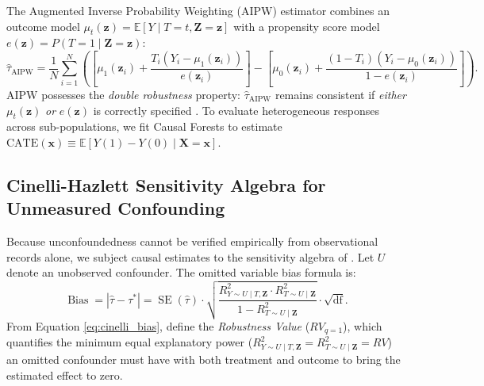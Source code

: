 The Augmented Inverse Probability Weighting (AIPW) estimator combines an outcome model $\mu_t(\mathbf{z}) = \mathbb{E}[Y \mid T=t, \mathbf{Z}=\mathbf{z}]$ with a propensity score model $e(\mathbf{z}) = P(T=1 \mid \mathbf{Z}=\mathbf{z})$:
\begin{equation}
    \hat{\tau}_{\text{AIPW}} = \frac{1}{N} \sum_{i=1}^N \left( \left[ \mu_1(\mathbf{z}_i) + \frac{T_i (Y_i - \mu_1(\mathbf{z}_i))}{e(\mathbf{z}_i)} \right] - \left[ \mu_0(\mathbf{z}_i) + \frac{(1 - T_i)(Y_i - \mu_0(\mathbf{z}_i))}{1 - e(\mathbf{z}_i)} \right] \right).
    \label{eq:aipw_estimator}
\end{equation}
AIPW possesses the \textit{double robustness} property: $\hat{\tau}_{\text{AIPW}}$ remains consistent if \emph{either} $\mu_t(\mathbf{z})$ \emph{or} $e(\mathbf{z})$ is correctly specified \parencite{hernan2020causal}. To evaluate heterogeneous responses across sub-populations, we fit Causal Forests \parencite{wager2018causalforest} to estimate $\text{CATE}(\mathbf{x}) \equiv \mathbb{E}[Y(1) - Y(0) \mid \mathbf{X} = \mathbf{x}]$.

\subsection{Cinelli-Hazlett Sensitivity Algebra for Unmeasured Confounding}

Because unconfoundedness cannot be verified empirically from observational records alone, we subject causal estimates to the sensitivity algebra of \textcite{cinelli2020making}. Let $U$ denote an unobserved confounder. The omitted variable bias formula is:
\begin{equation}
    \operatorname{Bias} = |\hat{\tau} - \tau^*| = \operatorname{SE}(\hat{\tau}) \cdot \sqrt{\frac{R^2_{Y \sim U \mid T, \mathbf{Z}} \cdot R^2_{T \sim U \mid \mathbf{Z}}}{1 - R^2_{T \sim U \mid \mathbf{Z}}}} \cdot \sqrt{\text{df}}.
    \label{eq:cinelli_bias}
\end{equation}
From Equation \eqref{eq:cinelli_bias}, \textcite{cinelli2020making} define the \textit{Robustness Value} ($RV_{q=1}$), which quantifies the minimum equal explanatory power ($R^2_{Y \sim U \mid T, \mathbf{Z}} = R^2_{T \sim U \mid \mathbf{Z}} = RV$) an omitted confounder must have with both treatment and outcome to bring the estimated effect to zero.

